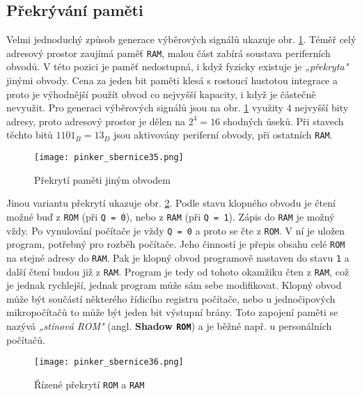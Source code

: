     \subsection{Překrývání paměti}
      Velmi jednoduchý způsob generace výběrových signálů ukazuje obr. \ref{MIT:fig_sbernice35}. 
      Téměř celý adresový prostor zaujímá paměť \texttt{RAM}, malou část zabírá soustava 
      periferních obvodů. V této pozici je paměť nedostupná, i když fyzicky existuje je 
      \emph{„překryta"} jinými obvody. Cena za jeden bit paměti klesá s rostoucí hustotou integrace 
      a proto je výhodnější použít obvod co nejvyšší kapacity, i když je částečně nevyužit. Pro 
      generaci výběrových signálů jsou na obr. \ref{MIT:fig_sbernice35} využity 4 nejvyšší bity 
      adresy, proto adresový prostor je dělen na \(2^4 = 16\) shodných úseků. Při stavech těchto 
      bitů \(1101_B = 13_D \) jsou aktivovány periferní obvody, při ostatních \texttt{RAM}.
    
      \begin{figure}[ht!] %
        \centering
        \texttt{[image: pinker\_sbernice35.png]}
        \caption{Překrytí paměti jiným obvodem}
        \label{MIT:fig_sbernice35}
      \end{figure}
      
      Jinou variantu překrytí ukazuje obr. \ref{MIT:fig_sbernice36}. Podle stavu klopného obvodu je 
      čtení možné buď z \texttt{ROM} (při \texttt{Q = 0}), nebo z \texttt{RAM} (při \texttt{Q = 
      1}). Zápis do \texttt{RAM}  je možný vždy. Po vynulování počítače je vždy \texttt{Q = 0} a 
      proto se čte z \texttt{ROM}. V ní je uložen program, potřebný pro rozběh počítače. Jeho 
      činností je přepis obsahu celé \texttt{ROM} na stejné adresy do \texttt{RAM}. Pak je klopný 
      obvod programově nastaven do stavu \texttt{1} a další čtení budou již z \texttt{RAM}. Program 
      je tedy od tohoto okamžiku čten z \texttt{RAM}, což je jednak rychlejší, jednak program může 
      sám sebe modifikovat. Klopný obvod může být součástí některého řídicího registru počítače, 
      nebo u jednočipových mikropočítačů to může být jeden bit výstupní brány. Toto zapojení paměti 
      se nazývá \emph{„stínová ROM"} (angl. \textbf{Shadow \texttt{ROM}}) a je běžné např. u 
      personálních počítačů.
      
      \begin{figure}[ht!] %
        \centering
        \texttt{[image: pinker\_sbernice36.png]}
        \caption{Řízené překrytí \texttt{ROM} a \texttt{RAM}}
        \label{MIT:fig_sbernice36}
      \end{figure}
    
